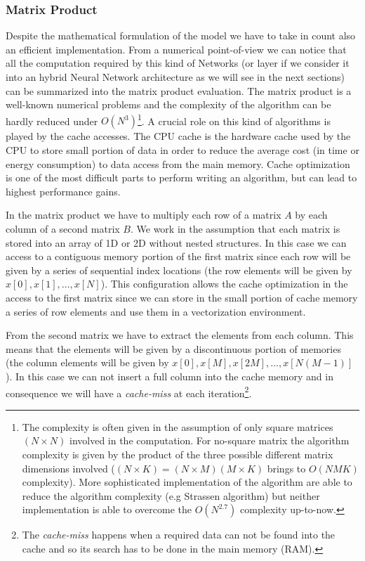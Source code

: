 \documentclass{standalone}
\begin{document}
\subsubsection[Matrix Product]{Matrix Product}\label{NN:gemm}

Despite the mathematical formulation of the model we have to take in count also an efficient implementation.
From a numerical point-of-view we can notice that all the computation required by this kind of Networks (or layer if we consider it into an hybrid Neural Network architecture as we will see in the next sections) can be summarized into the matrix product evaluation.
The matrix product is a well-known numerical problems and the complexity of the algorithm can be hardly reduced under $O(N^3)$\footnote{
  The complexity is often given in the assumption of only square matrices $(N\times N)$ involved in the computation.
  For no-square matrix the algorithm complexity is given by the product of the three possible different matrix dimensions involved ($(N\times K) = (N\times M)(M\times K)$ brings to $O(NMK)$ complexity).
  More sophisticated implementation of the algorithm are able to reduce the algorithm complexity (e.g Strassen algorithm) but neither implementation is able to overcome the $O(N^{2.7})$ complexity up-to-now.
}.
A crucial role on this kind of algorithms is played by the cache accesses.
The CPU cache is the hardware cache used by the CPU to store small portion of data in order to reduce the average cost (in time or energy consumption) to data access from the main memory.
Cache optimization is one of the most difficult parts to perform writing an algorithm, but can lead to highest performance gains.

In the matrix product we have to multiply each row of a matrix $A$ by each column of a second matrix $B$.
We work in the assumption that each matrix is stored into an array of 1D or 2D without nested structures.
In this case we can access to a contiguous memory portion of the first matrix since each row will be given by a series of sequential index locations (the row elements will be given by $x[0], x[1], \dots, x[N]$).
This configuration allows the cache optimization in the access to the first matrix since we can store in the small portion of cache memory a series of row elements and use them in a vectorization environment.

From the second matrix we have to extract the elements from each column.
This means that the elements will be given by a discontinuous portion of memories (the column elements will be given by $x[0], x[M], x[2M], \dots, x[N(M-1)]$).
In this case we can not insert a full column into the cache memory and in consequence we will have a \emph{cache-miss} at each iteration\footnote{
  The \emph{cache-miss} happens when a required data can not be found into the cache and so its search has to be done in the main memory (RAM).
}.
\end{document}
